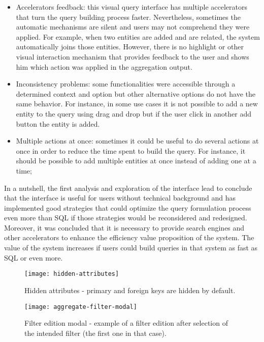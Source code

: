 \begin{itemize}
    \item Accelerators feedback: this visual query interface has multiple accelerators that turn the query building process faster. Nevertheless, sometimes the automatic mechanisms are silent and users may not comprehend they were applied. For example, when two entities are added and are related, the system automatically joins those entities. However, there is no highlight or other visual interaction mechanism that provides feedback to the user and shows him which action was applied in the aggregation output.
    \item Inconsistency problems: some functionalities were accessible through a determined context and option but other alternative options do not have the same behavior. For instance, in some use cases it is not possible to add a new entity to the query using drag and drop but if the user click in another add button the entity is added.
    \item Multiple actions at once: sometimes it could be useful to do several actions at once in order to reduce the time spent to build the query. For instance, it should be possible to add multiple entities at once instead of adding one at a time; 
\end{itemize}

In a nutshell, the first analysis and exploration of the interface lead to conclude that the interface is useful for users without technical background and has implemented good strategies that could optimize the query formulation process even more than \gls{SQL} if those strategies would be reconsidered and redesigned. Moreover, it was concluded that it is necessary to provide search engines and other accelerators to enhance the efficiency value proposition of the system. The value of the system increases if users could build queries in that system as fast as \gls{SQL} or even more.

\begin{figure}[htbp]
	\centering
	\texttt{[image: hidden-attributes]}
	\caption{Hidden attributes - primary and foreign keys are hidden by default.}
	\label{fig:hiddenAttributes}
\end{figure}

\begin{figure}[htbp]
	\centering
	\texttt{[image: aggregate-filter-modal]}
	\caption{Filter edition modal - example of a filter edition after selection of the intended filter (the first one in that case).}
	\label{fig:aggregateFilterModal}
\end{figure}

